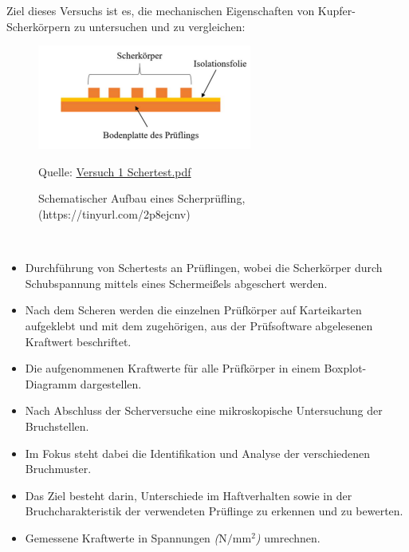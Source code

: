 Ziel dieses Versuchs ist es, die mechanischen Eigenschaften von Kupfer-Scherkörpern zu untersuchen und zu vergleichen:
\\
\vspace{0.05cm}
\begin{figure}[h]
    \centering
    \includegraphics[scale=0.95]{Bilder/schematik.png}
    \caption{ Schematischer Aufbau eines Scherprüfling, (https://tinyurl.com/2p8ejcnv)}
    \par Quelle: \href{https://learn.fh-kiel.de/mod/folder/view.php?id=160797}{Versuch 1 Schertest.pdf}
    \vspace{0.2cm}
    \label{Abb.2: Schematischer Aufbau eines Scherprüfling } 
\end{figure}\\

\begin{itemize}
\item Durchführung von Schertests an Prüflingen, wobei die Scherkörper durch Schubspannung mittels eines Schermeißels abgeschert werden.
\item Nach dem Scheren werden die einzelnen Prüfkörper auf Karteikarten aufgeklebt und mit dem zugehörigen, aus der Prüfsoftware abgelesenen Kraftwert beschriftet.
\item Die aufgenommenen Kraftwerte für alle Prüfkörper in einem Boxplot-Diagramm dargestellen.
\item Nach Abschluss der Scherversuche eine mikroskopische Untersuchung der Bruchstellen.
\item Im Fokus steht dabei die Identifikation und Analyse der verschiedenen Bruchmuster.
\item Das Ziel besteht darin, Unterschiede im Haftverhalten sowie in der Bruchcharakteristik der verwendeten Prüflinge zu erkennen und zu bewerten.
\item Gemessene Kraftwerte in Spannungen \textit{($\mathrm{N/mm^2}$)}  umrechnen.
\end{itemize}
